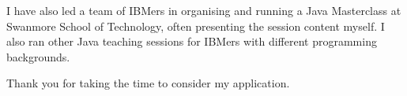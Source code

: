 \documentclass[10pt,stdletter,dateno,sigleft]{newlfm} %
\begin{document}
\begin{newlfm}
I have also led a team of IBMers in organising and running a Java Masterclass
at Swanmore School of Technology, often presenting the session content myself.
I also ran other Java teaching sessions for IBMers with different programming
backgrounds.



 

Thank you for taking the time to consider my application.


\end{newlfm}
\end{document}
